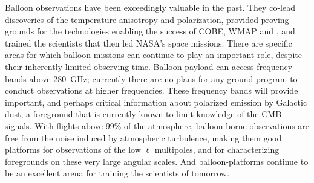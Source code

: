\documentclass[PICOReport.tex]{subfiles}
\begin{document}

Balloon observations have been exceedingly valuable in the past. They co-lead discoveries of the temperature anisotropy and polarization, provided proving grounds for the technologies enabling the success of COBE, WMAP and \planck , and trained the scientists that then led NASA's space missions. There are specific areas for which balloon missions can continue to play an important role, despite their inherently limited observing time. Balloon payload can access frequency bands above 280~GHz; currently there are no plans for any ground program to conduct observations at higher frequencies. These frequency bands will provide important, and perhaps critical information about polarized emission by  Galactic dust, a foreground that is currently known to limit knowledge of the CMB signals.  With flights above 99\% of the atmosphere, balloon-borne observations are free from the noise induced by atmospheric turbulence, making them good platforms for observations of the low $\ell$ multipoles, and for characterizing foregrounds on these very large angular scales. And balloon-platforms continue to be an excellent arena for training the scientists of tomorrow. 

\end{document}
